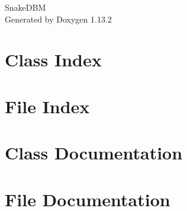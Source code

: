 \documentclass[twoside]{book}
\newcommand{\+}{\discretionary{\mbox{\scriptsize$\hookleftarrow$}}{}{}}
\newcommand{\clearemptydoublepage}{%
    \newpage{\pagestyle{empty}\cleardoublepage}%
  }
\begin{document}
  \raggedbottom
    \hypersetup{pageanchor=false,
                bookmarksnumbered=true,
                pdfencoding=unicode
               }
  \begin{titlepage}
  \vspace*{7cm}
  \begin{center}%
  {\Large Snake\+DBM}\\
  \vspace*{1cm}
  {\large Generated by Doxygen 1.13.2}\\
  \end{center}
  \end{titlepage}
  \clearemptydoublepage
  \tableofcontents
  \clearemptydoublepage
  \hypersetup{pageanchor=true}
\chapter{Class Index}

\chapter{File Index}

\chapter{Class Documentation}





\chapter{File Documentation}




  \backmatter
  \newpage
  \clearemptydoublepage
  \printindex
\end{document}
